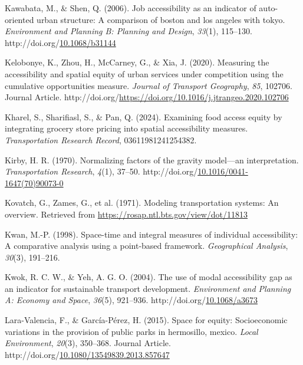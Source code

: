 \documentclass[
11pt, %
oneside, %
english, %
singlespacing, %
]{macthesis} %
\newlength{\cslhangindent}
\newenvironment{CSLReferences}[2] %
{\begin{list}{}{%
	\setlength{\itemindent}{0pt}
	\setlength{\leftmargin}{0pt}
	\setlength{\parsep}{0pt}
	\ifodd #1
	\setlength{\leftmargin}{\cslhangindent}
	\setlength{\itemindent}{-1\cslhangindent}
	\fi
	\setlength{\itemsep}{#2\baselineskip}}}
{\end{list}}
\begin{document}
\begin{CSLReferences}{1}{0}
Kawabata, M., \& Shen, Q. (2006). Job accessibility as an indicator of auto-oriented urban structure: A comparison of boston and los angeles with tokyo. \emph{Environment and Planning B: Planning and Design}, \emph{33}(1), 115--130. http://doi.org/\href{https://doi.org/10.1068/b31144}{10.1068/b31144}

Kelobonye, K., Zhou, H., McCarney, G., \& Xia, J. (2020). Measuring the accessibility and spatial equity of urban services under competition using the cumulative opportunities measure. \emph{Journal of Transport Geography}, \emph{85}, 102706. Journal Article. http://doi.org/\url{https://doi.org/10.1016/j.jtrangeo.2020.102706}

Kharel, S., Sharifiasl, S., \& Pan, Q. (2024). Examining food access equity by integrating grocery store pricing into spatial accessibility measures. \emph{Transportation Research Record}, 03611981241254382.

Kirby, H. R. (1970). Normalizing factors of the gravity model---an interpretation. \emph{Transportation Research}, \emph{4}(1), 37--50. http://doi.org/\href{https://doi.org/10.1016/0041-1647(70)90073-0}{10.1016/0041-1647(70)90073-0}

Kovatch, G., Zames, G., et al. (1971). Modeling transportation systems: An overview. Retrieved from \url{https://rosap.ntl.bts.gov/view/dot/11813}

Kwan, M.-P. (1998). Space-time and integral measures of individual accessibility: A comparative analysis using a point-based framework. \emph{Geographical Analysis}, \emph{30}(3), 191--216.

Kwok, R. C. W., \& Yeh, A. G. O. (2004). The use of modal accessibility gap as an indicator for sustainable transport development. \emph{Environment and Planning A: Economy and Space}, \emph{36}(5), 921--936. http://doi.org/\href{https://doi.org/10.1068/a3673}{10.1068/a3673}

Lara-Valencia, F., \& García-Pérez, H. (2015). Space for equity: Socioeconomic variations in the provision of public parks in hermosillo, mexico. \emph{Local Environment}, \emph{20}(3), 350--368. Journal Article. http://doi.org/\href{https://doi.org/10.1080/13549839.2013.857647}{10.1080/13549839.2013.857647}


\end{CSLReferences}
\end{document}
